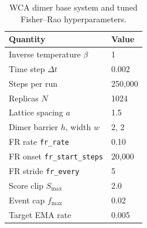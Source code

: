 \begin{table}[t]
\centering
\small
\caption{WCA dimer base system and tuned Fisher--Rao hyperparameters.}
\label{tab:wca_design}
\begin{tabular}{ll}
\toprule
Quantity & Value \\
\midrule
Inverse temperature $\beta$ & 1 \\
Time step $\Delta t$ & 0.002 \\
Steps per run & 250{,}000 \\
Replicas $N$ & 1024 \\
Lattice spacing $a$ & 1.5 \\
Dimer barrier $h$, width $w$ & 2, 2 \\
FR rate \texttt{fr\_rate} & 0.10 \\
FR onset \texttt{fr\_start\_steps} & 20{,}000 \\
FR stride \texttt{fr\_every} & 5 \\
Score clip $S_{\max}$ & 2.0 \\
Event cap $f_{\max}$ & 0.02 \\
Target EMA rate & 0.005 \\
\bottomrule
\end{tabular}
\end{table}

